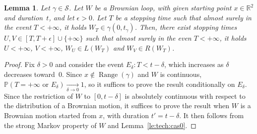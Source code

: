 \documentclass[11pt]{article}
\newtheorem{lemma}[theorem]{Lemma}
\DeclareMathOperator{\Range}{Range}
\begin{document}
\begin{lemma}
    \label{le:tech:casT1}
    Let $\gamma\in \mathscr{S}$.
    Let $W$ be a Brownian loop, with given starting point $x\in \mathbb{R}^2$ and duration~$t$, and let $\epsilon>0$. Let $T$ be a stopping time such that almost surely in the event $T<+\infty$, it holds $W_T\in \gamma(0,t_\gamma)$. Then, there exist stopping times  $U,V\in [T,T+\epsilon]\cup \{+\infty\}$ such that almost surely in the even $T<+\infty$, it holds $U<+\infty$, $V<+\infty$, $W_U\in  L(W_T)$ and $W_V\in R(W_T)$.
\end{lemma}
\begin{proof}
    Fix $\delta>0$ and consider the event $E_\delta: T< t-\delta$, which increases as $\delta$ decreases toward~$0$. Since $x\notin \Range(\gamma)$ and $W$ is continuous, $\mathbb{P}(T=+\infty \text{ or }E_\delta)\underset{\delta \to 0}\longrightarrow 1$, so it suffices to prove the result conditionally on $E_\delta$. Since the restriction of $W$ to $[0, t-\delta]$ is absolutely continuous with respect to the distribution of a Brownian motion, it suffices to prove the result when $W$ is a Brownian motion started from $x$, with duration $t'=t-\delta$. It then follows from the strong Markov property of $W$ and Lemma~\ref{le:tech:cas0}.
\end{proof}
\end{document}
